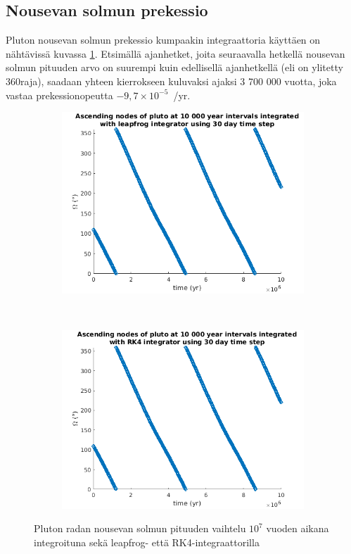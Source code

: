 \documentclass[12pt,a4paper,titlepage]{article}
\begin{document}
\subsection{Nousevan solmun prekessio}
Pluton nousevan solmun prekessio kumpaakin integraattoria käyttäen on nähtävissä kuvassa \ref{longrun-Omegas}. Etsimällä ajanhetket, joita seuraavalla hetkellä nousevan solmun pituuden arvo on suurempi kuin edellisellä ajanhetkellä (eli on ylitetty 360\textdegree raja), saadaan yhteen kierrokseen kuluvaksi ajaksi 
3 700 000 vuotta, joka vastaa prekessionopeutta \mbox{$-9,7\times 10^{-5}$ \textdegree /yr}.


\begin{figure}[h!]
    \centering
    \begin{subfigure}[b]{0.8\textwidth}
        \includegraphics[width=\textwidth]{../plots/lf-longrun-Omega.png}
    \end{subfigure}
    \\
    \begin{subfigure}[b]{0.8\textwidth}
        \includegraphics[width=\textwidth]{../plots/rk-longrun-Omega.png}
    \end{subfigure}
    \caption{Pluton radan nousevan solmun pituuden vaihtelu $10^7$ vuoden aikana integroituna sekä leapfrog- että RK4-integraattorilla}\label{longrun-Omegas}
\end{figure}
\end{document}
